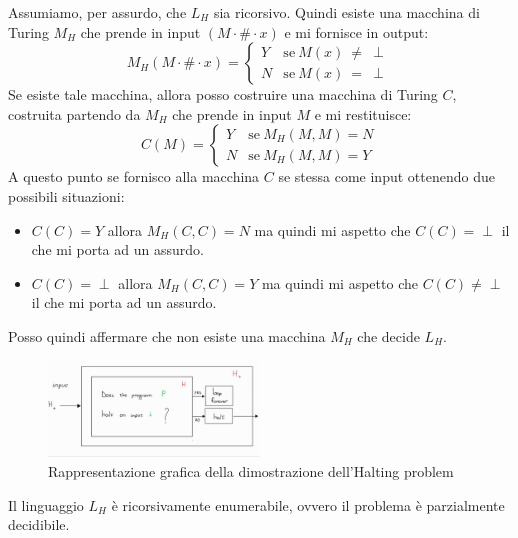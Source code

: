 \begin{dimostrazione} 
    Assumiamo, per assurdo, che $L_H$ sia ricorsivo. Quindi esiste una macchina
    di Turing $M_H$ che prende in input $(M \cdot \# \cdot x)$ e mi fornisce in
    output:
    \begin{equation}
        M_H (M \cdot \# \cdot x) = \begin{cases}
            Y & \text{se} \ M(x) \ \neq \ \perp \\
            N & \text{se} \ M(x) \  = \ \perp
        \end{cases}
    \end{equation}
    Se esiste tale macchina, allora posso costruire una macchina di Turing $C$,
    costruita partendo da $M_H$ che prende in input $M$ e mi restituisce:
    \begin{equation}
        C(M) = \begin{cases}
            Y & \text{se} \ M_H(M, M) = N \\
            N & \text{se} \ M_H(M, M) = Y
        \end{cases}
    \end{equation}
    A questo punto se fornisco alla macchina $C$ se stessa come input ottenendo
    due possibili situazioni:
    \begin{itemize}
        \item $C(C) = Y$ allora $M_H(C, C) = N$ ma quindi mi aspetto che
              $C(C) = \perp$ il che mi porta ad un assurdo.
        \item $C(C) = \perp$ allora $M_H(C, C) =  Y$ ma quindi mi aspetto che
              $C(C) \neq \perp$ il che mi porta ad un assurdo.
    \end{itemize}
    Posso quindi affermare che non esiste una macchina $M_H$ che decide $L_H$.
    \begin{figure}[!ht]
        \centering
        \includegraphics[width=0.5\textwidth]{img/MacchineTuring/halt.png}
        \caption{Rappresentazione grafica della dimostrazione dell'Halting problem}
    \end{figure}
\end{dimostrazione}
\begin{teorema} \label{teo-lh-rec-en}
    Il linguaggio $L_H$ è ricorsivamente enumerabile, ovvero il problema è
    parzialmente decidibile.
\end{teorema}
